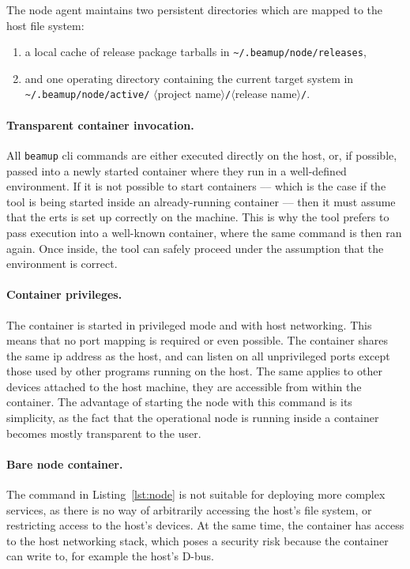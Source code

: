 The node agent maintains two persistent directories which are mapped to the host file system: \begin{enumerate}[label=(\roman*)]
  \item a local cache of release package tarballs in \lstinline[breaklines=true]|~/.beamup/node/releases|,
  \item and one operating directory containing the current target system in \lstinline[breaklines=true]|~/.beamup/node/active/|
  $\langle$project name$\rangle$\lstinline|/|$\langle$release name$\rangle$\lstinline|/|.
\end{enumerate}


\paragraph{Transparent container invocation.}
All \lstinline|beamup| \acrshort{cli} commands are either executed directly on the host, or, if possible, passed into a newly started container where they run in a well-defined environment. If it is not possible to start containers –– which is the case if the tool is being started inside an already-running container –– then it must assume that the \acrshort{erts} is  set up correctly on the machine. This is why the tool prefers to pass execution into a well-known container, where the same command is then ran again. Once inside, the tool can safely proceed under the assumption that the environment is correct.~\cite{zak18}


\paragraph{Container privileges.}
The container is started in privileged mode and with host networking. This means that no port mapping is required or even possible. The container shares the same \acrshort{ip} address as the host, and can listen on all unprivileged ports except those used by other programs running on the host. The same applies to other devices attached to the host machine, they are accessible from within the container. The advantage of starting the node with this command is its simplicity, as the fact that the operational node is running inside a container becomes mostly transparent to the user.

\paragraph{Bare node container.}
The command in Listing~\ref{lst:node} is not suitable for deploying more complex services, as there is no way of arbitrarily accessing the host's file system, or restricting access to the host's devices. At the same time, the container has access to the host networking stack, which poses a security risk because the container can write to, for example the host's D-bus.~\cite{docker:docs}

